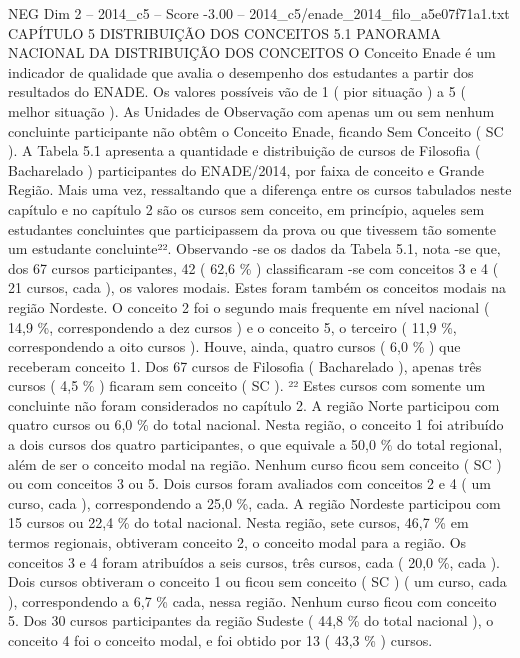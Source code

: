 \begin{textsample}{NEG Dim 2 – 2014\_c5 – Score -3.00 – 2014\_c5/enade\_2014\_filo\_a5e07f71a1.txt}  \label{ex:f2_neg_122}
CAPÍTULO 5 DISTRIBUIÇÃO DOS CONCEITOS 5.1 PANORAMA NACIONAL DA DISTRIBUIÇÃO DOS CONCEITOS O Conceito Enade é um indicador de qualidade que avalia o desempenho dos estudantes a partir dos resultados do ENADE.
Os valores possíveis vão de 1 ( pior situação ) a 5 ( melhor situação ).
As Unidades de Observação com apenas um ou sem nenhum concluinte participante não obtêm o Conceito Enade, ficando Sem Conceito ( SC ).
A Tabela 5.1 apresenta a quantidade e distribuição de cursos de Filosofia ( Bacharelado ) participantes do ENADE/2014, por faixa de conceito e Grande Região.
Mais uma vez, ressaltando que a diferença entre os cursos tabulados neste capítulo e no capítulo 2 são os cursos sem conceito, em princípio, aqueles sem estudantes concluintes que participassem da prova ou que tivessem tão somente um estudante concluinte²².
Observando -se os dados da Tabela 5.1, nota -se que, dos 67 cursos participantes, 42 ( 62,6 \% ) classificaram -se com conceitos 3 e 4 ( 21 cursos, cada ), os valores modais.
Estes foram também os conceitos modais na região Nordeste.
O conceito 2 foi o segundo mais frequente em nível nacional ( 14,9 \%, correspondendo a dez cursos ) e o conceito 5, o terceiro ( 11,9 \%, correspondendo a oito cursos ).
Houve, ainda, quatro cursos ( 6,0 \% ) que receberam conceito 1.
Dos 67 cursos de Filosofia ( Bacharelado ), apenas três cursos ( 4,5 \% ) ficaram sem conceito ( SC ). ²² Estes cursos com somente um concluinte não foram considerados no capítulo 2.
A região Norte participou com quatro cursos ou 6,0 \% do total nacional.
Nesta região, o conceito 1 foi atribuído a dois cursos dos quatro participantes, o que equivale a 50,0 \% do total regional, além de ser o conceito modal na região.
Nenhum curso ficou sem conceito ( SC ) ou com conceitos 3 ou 5.
Dois cursos foram avaliados com conceitos 2 e 4 ( um curso, cada ), correspondendo a 25,0 \%, cada.
A região Nordeste participou com 15 cursos ou 22,4 \% do total nacional.
Nesta região, sete cursos, 46,7 \% em termos regionais, obtiveram conceito 2, o conceito modal para a região.
Os conceitos 3 e 4 foram atribuídos a seis cursos, três cursos, cada ( 20,0 \%, cada ).
Dois cursos obtiveram o conceito 1 ou ficou sem conceito ( SC ) ( um curso, cada ), correspondendo a 6,7 \% cada, nessa região.
Nenhum curso ficou com conceito 5.
Dos 30 cursos participantes da região Sudeste ( 44,8 \% do total nacional ), o conceito 4 foi o conceito modal, e foi obtido por 13 ( 43,3 \% ) cursos.

\end{textsample}
